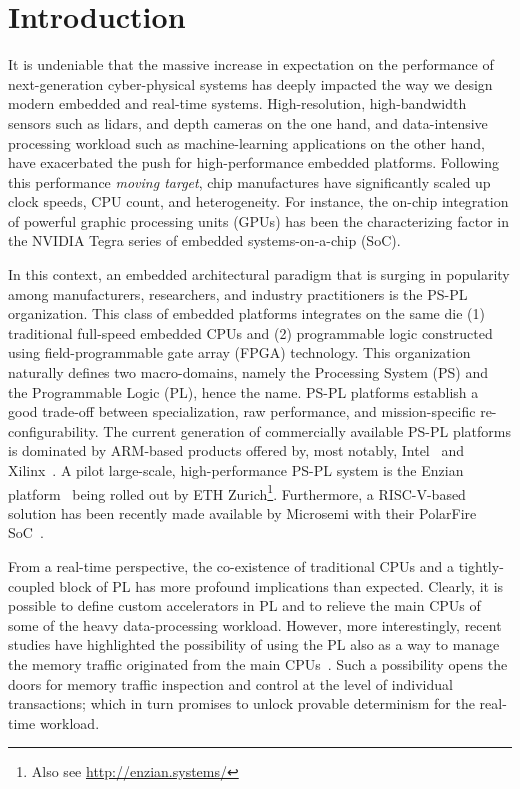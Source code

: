 \section{Introduction}

It is undeniable that the massive increase in expectation on the
performance of next-generation cyber-physical systems has deeply
impacted the way we design modern embedded and real-time
systems. High-resolution, high-bandwidth sensors such as lidars, and
depth cameras on the one hand, and data-intensive processing workload
such as machine-learning applications on the other hand, have
exacerbated the push for high-performance embedded
platforms. Following this performance \emph{moving target}, chip
manufactures have significantly scaled up clock speeds, CPU count, and
heterogeneity. For instance, the on-chip integration of powerful
graphic processing units (GPUs) has been the characterizing factor in
the NVIDIA Tegra series of embedded systems-on-a-chip (SoC).

In this context, an embedded architectural paradigm that is surging in
popularity among manufacturers, researchers, and industry
practitioners is the PS-PL organization. This class of embedded
platforms integrates on the same die (1) traditional full-speed
embedded CPUs and (2) programmable logic constructed using
field-programmable gate array (FPGA) technology. This organization
naturally defines two macro-domains, namely the Processing System (PS)
and the Programmable Logic (PL), hence the name. PS-PL platforms
establish a good trade-off between specialization, raw performance,
and mission-specific re-configurability. The current generation of
commercially available PS-PL platforms is dominated by ARM-based
products offered by, most notably, Intel~\cite{intel_stratix10} and
Xilinx~\cite{zynq_ultrascale}. A pilot large-scale, high-performance PS-PL
system is the Enzian platform~\cite{enzian2020cidr} being rolled out by ETH
Zurich\footnote{Also see \url{http://enzian.systems/}}. Furthermore, a
RISC-V-based solution has been recently made available by Microsemi
with their PolarFire SoC~\cite{microsemi_polarfire}. 

From a real-time perspective, the co-existence of traditional CPUs and
a tightly-coupled block of PL has more profound implications than
expected. Clearly, it is possible to define custom accelerators in PL
and to relieve the main CPUs of some of the heavy data-processing
workload. However, more interestingly, recent studies have highlighted the
possibility of using the PL also as a way to manage the memory traffic
originated from the main CPUs~\cite{lime_2018, PLIM20}. Such a
possibility opens the doors for memory traffic inspection and control
at the level of individual transactions; which in turn promises to
unlock provable determinism for the real-time workload.

